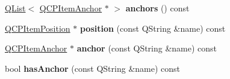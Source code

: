 \begin{DoxyCompactItemize}
\item 
\hyperlink{class_q_list}{Q\+List}$<$ \hyperlink{class_q_c_p_item_anchor}{Q\+C\+P\+Item\+Anchor} $\ast$ $>$ {\bfseries anchors} () const \hypertarget{class_q_c_p_abstract_item_ae4a33917ec04149231f633bf4294e8ac}{}\label{class_q_c_p_abstract_item_ae4a33917ec04149231f633bf4294e8ac}

\item 
\hyperlink{class_q_c_p_item_position}{Q\+C\+P\+Item\+Position} $\ast$ {\bfseries position} (const Q\+String \&name) const \hypertarget{class_q_c_p_abstract_item_ad4f5360ef49161b2da76a019e7da3a3c}{}\label{class_q_c_p_abstract_item_ad4f5360ef49161b2da76a019e7da3a3c}

\item 
\hyperlink{class_q_c_p_item_anchor}{Q\+C\+P\+Item\+Anchor} $\ast$ {\bfseries anchor} (const Q\+String \&name) const \hypertarget{class_q_c_p_abstract_item_abb37b132737a1232779d01c274ce79ab}{}\label{class_q_c_p_abstract_item_abb37b132737a1232779d01c274ce79ab}

\item 
bool {\bfseries has\+Anchor} (const Q\+String \&name) const \hypertarget{class_q_c_p_abstract_item_acbce9e5ba5252541d19db0c40303357a}{}\label{class_q_c_p_abstract_item_acbce9e5ba5252541d19db0c40303357a}

\end{DoxyCompactItemize}
